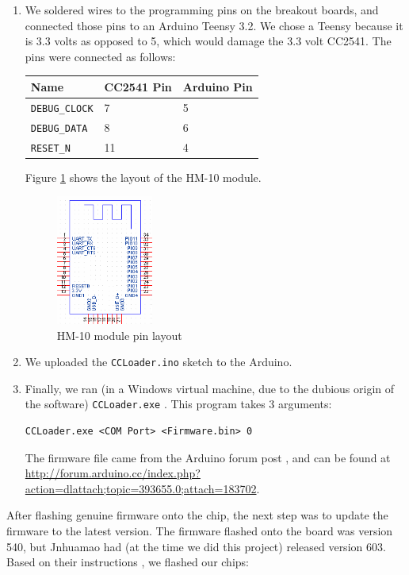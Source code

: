 \documentclass[]{article}
\begin{document}
\begin{enumerate}
\item
  We soldered wires to the programming pins on the breakout boards, and connected those pins to an Arduino Teensy 3.2.
  We chose a Teensy because it is 3.3 volts as opposed to 5, which would damage the 3.3 volt CC2541. The pins were connected as follows:

  \begin{longtable}[]{@{}lll@{}}
  \toprule
  Name & CC2541 Pin & Arduino Pin\tabularnewline
  \midrule
  \endhead
  \texttt{DEBUG\_CLOCK} & 7 & 5\tabularnewline
  \texttt{DEBUG\_DATA} & 8 & 6\tabularnewline
  \texttt{RESET\_N} & 11 & 4\tabularnewline
  \bottomrule
  \end{longtable}

  Figure \ref{fig:hm10} shows the layout of the HM-10 module.
  \begin{figure}
    \centering
    \includegraphics[width=0.3\textwidth]{hm10_pins.png}
    \caption{HM-10 module pin layout \cite{crystal}}
    \label{fig:hm10}
  \end{figure}

\item
  We uploaded the \texttt{CCLoader.ino} \cite{ccloader} sketch to the Arduino.
\item
  Finally, we ran (in a Windows virtual machine, due to the dubious origin of the software) \texttt{CCLoader.exe} \cite{ccloaderexe}.
  This program takes 3 arguments:

  \begin{Verbatim}[gobble=4]
    CCLoader.exe <COM Port> <Firmware.bin> 0
  \end{Verbatim}

  The firmware file came from the Arduino forum post \cite{crystal}, and can be
  found at \url{http://forum.arduino.cc/index.php?action=dlattach;topic=393655.0;attach=183702}.
\end{enumerate}

After flashing genuine firmware onto the chip, the next step was to update the firmware to the latest version.
The firmware flashed onto the board was version 540, but Jnhuamao had (at the time we did this project) released version 603. \cite{jnhuamao603}
Based on their instructions \cite{jnhuamaoinstructions}, we flashed our chips:
\end{document}
